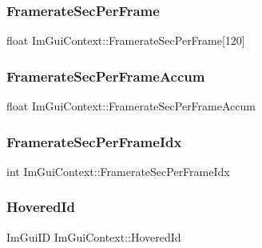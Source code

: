 \hypertarget{struct_im_gui_context_aca772ab262c0094e8bbe7eae215fc23b}{}\label{struct_im_gui_context_aca772ab262c0094e8bbe7eae215fc23b} 
\subsubsection{\texorpdfstring{Framerate\+Sec\+Per\+Frame}{FramerateSecPerFrame}}
{\footnotesize\ttfamily float Im\+Gui\+Context\+::\+Framerate\+Sec\+Per\+Frame\mbox{[}120\mbox{]}}

\hypertarget{struct_im_gui_context_abcd18f2f8fedf0f45c3148b3e956e653}{}\label{struct_im_gui_context_abcd18f2f8fedf0f45c3148b3e956e653} 
\subsubsection{\texorpdfstring{Framerate\+Sec\+Per\+Frame\+Accum}{FramerateSecPerFrameAccum}}
{\footnotesize\ttfamily float Im\+Gui\+Context\+::\+Framerate\+Sec\+Per\+Frame\+Accum}

\hypertarget{struct_im_gui_context_a64a96ad72dd7009dba134f6214a4936e}{}\label{struct_im_gui_context_a64a96ad72dd7009dba134f6214a4936e} 
\subsubsection{\texorpdfstring{Framerate\+Sec\+Per\+Frame\+Idx}{FramerateSecPerFrameIdx}}
{\footnotesize\ttfamily int Im\+Gui\+Context\+::\+Framerate\+Sec\+Per\+Frame\+Idx}

\hypertarget{struct_im_gui_context_a32bef5a7740179ad8076643b001f15e4}{}\label{struct_im_gui_context_a32bef5a7740179ad8076643b001f15e4} 
\subsubsection{\texorpdfstring{Hovered\+Id}{HoveredId}}
{\footnotesize\ttfamily Im\+Gui\+ID Im\+Gui\+Context\+::\+Hovered\+Id}

